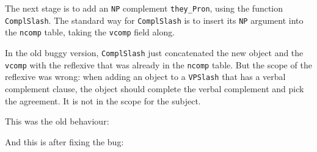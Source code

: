 \begin{EmptyItem}
\begin{Highlighting}[]
    \FunctionTok{=}  \NormalTok{;}
\FunctionTok{=}  \OtherTok{=>}  \NormalTok{; } \OtherTok{=>} 
\FunctionTok{=}  \NormalTok{;}
\end{Highlighting}
\end{EmptyItem}

The next stage is to add an \texttt{NP} complement \texttt{they\_Pron},
using the function \texttt{ComplSlash}. The standard way for
\texttt{ComplSlash} is to insert its \texttt{NP} argument into the
\texttt{ncomp} table, taking the \texttt{vcomp} field along.

In the old buggy version, \texttt{ComplSlash} just concatenated the new
object and the \texttt{vcomp} with the reflexive that was already in the
\texttt{ncomp} table. But the scope of the reflexive was wrong: when
adding an object to a \texttt{VPSlash} that has a verbal complement
clause, the object should complete the verbal complement and pick the
agreement. It is not in the scope for the subject.

This was the old behaviour:

\begin{EmptyItem}
\begin{Highlighting}[]
    \FunctionTok{=}  \NormalTok{;}
\FunctionTok{=}  \OtherTok{=>}  \NormalTok{; } \OtherTok{=>} 
\FunctionTok{=} \NormalTok{[] \} ;}
\end{Highlighting}
\end{EmptyItem}

And this is after fixing the bug:

\begin{EmptyItem}
\begin{Highlighting}[]
    \FunctionTok{=}  \NormalTok{;}
\FunctionTok{=} \OtherTok{=>}  \NormalTok{\} ;}
\FunctionTok{=} \NormalTok{[] ;}
\end{Highlighting}
\end{EmptyItem}

